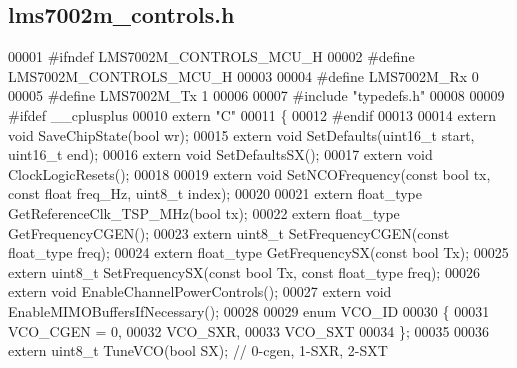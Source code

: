 \subsection{lms7002m\+\_\+controls.\+h}
\label{lms7002m__controls_8h_source}

\begin{DoxyCode}
00001 \textcolor{preprocessor}{#ifndef LMS7002M\_CONTROLS\_MCU\_H}
00002 \textcolor{preprocessor}{#define LMS7002M\_CONTROLS\_MCU\_H}
00003 
00004 \textcolor{preprocessor}{#define LMS7002M\_Rx 0}
00005 \textcolor{preprocessor}{#define LMS7002M\_Tx 1}
00006 
00007 \textcolor{preprocessor}{#include "typedefs.h"}
00008 
00009 \textcolor{preprocessor}{#ifdef \_\_cplusplus}
00010 \textcolor{keyword}{extern} \textcolor{stringliteral}{"C"}
00011 \{
00012 \textcolor{preprocessor}{#endif}
00013 
00014 \textcolor{keyword}{extern} \textcolor{keywordtype}{void} SaveChipState(\textcolor{keywordtype}{bool} wr);
00015 \textcolor{keyword}{extern} \textcolor{keywordtype}{void} SetDefaults(uint16\_t start, uint16\_t end);
00016 \textcolor{keyword}{extern} \textcolor{keywordtype}{void} SetDefaultsSX();
00017 \textcolor{keyword}{extern} \textcolor{keywordtype}{void} ClockLogicResets();
00018 
00019 \textcolor{keyword}{extern} \textcolor{keywordtype}{void} SetNCOFrequency(\textcolor{keyword}{const} \textcolor{keywordtype}{bool} tx, \textcolor{keyword}{const} \textcolor{keywordtype}{float} freq\_Hz, uint8\_t index);
00020 
00021 \textcolor{keyword}{extern} float_type GetReferenceClk_TSP_MHz(\textcolor{keywordtype}{bool} tx);
00022 \textcolor{keyword}{extern} float_type GetFrequencyCGEN();
00023 \textcolor{keyword}{extern} uint8\_t SetFrequencyCGEN(\textcolor{keyword}{const} float_type freq);
00024 \textcolor{keyword}{extern} float_type GetFrequencySX(\textcolor{keyword}{const} \textcolor{keywordtype}{bool} Tx);
00025 \textcolor{keyword}{extern} uint8\_t SetFrequencySX(\textcolor{keyword}{const} \textcolor{keywordtype}{bool} Tx, \textcolor{keyword}{const} float_type freq);
00026 \textcolor{keyword}{extern} \textcolor{keywordtype}{void} EnableChannelPowerControls();
00027 \textcolor{keyword}{extern} \textcolor{keywordtype}{void} EnableMIMOBuffersIfNecessary();
00028 
00029 \textcolor{keyword}{enum} VCO_ID
00030 \{
00031     VCO_CGEN = 0,
00032     VCO_SXR,
00033     VCO_SXT
00034 \};
00035 
00036 \textcolor{keyword}{extern} uint8\_t TuneVCO(\textcolor{keywordtype}{bool} SX); \textcolor{comment}{// 0-cgen, 1-SXR, 2-SXT}

\end{DoxyCode}
